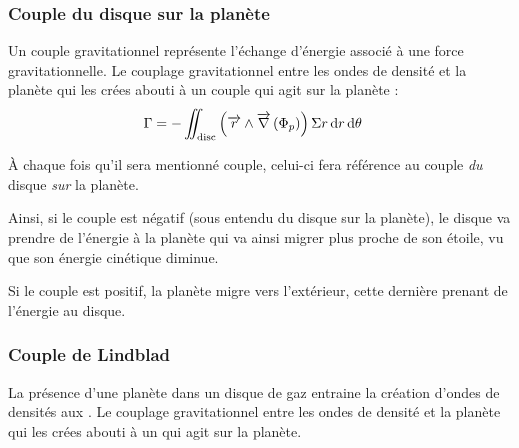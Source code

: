 
\subsubsection{Couple du disque sur la planète}
Un couple gravitationnel représente l'échange d'énergie associé à une force gravitationnelle.  Le couplage gravitationnel entre les ondes de densité et la planète qui les crées abouti à un couple qui agit sur la planète : 
\begin{align}
\Gamma &= - \iint_\text{disc} \left({\overrightarrow{r}}\wedge{\overrightarrow{\nabla}} \left( \Phi_p\right)\right)\Sigma r \operatorname{d \!} r \operatorname{d \!} \theta
\end{align}

À chaque fois qu'il sera mentionné \og couple\fg, celui-ci fera référence au couple \emph{du} disque \emph{sur} la planète.

Ainsi, si le couple est négatif (sous entendu du disque sur la planète), le disque va prendre de l'énergie à la planète qui va ainsi migrer plus proche de son étoile, vu que son énergie cinétique diminue.

Si le couple est positif, la planète migre vers l'extérieur, cette dernière prenant de l'énergie au disque.

\subsubsection{Couple de Lindblad}
La présence d'une planète dans un disque de gaz entraine la création d'ondes de densités aux  \citep{goldreich1979excitation}. Le couplage gravitationnel entre les ondes de densité et la planète qui les crées abouti à un  qui agit sur la planète.

\bigskip



